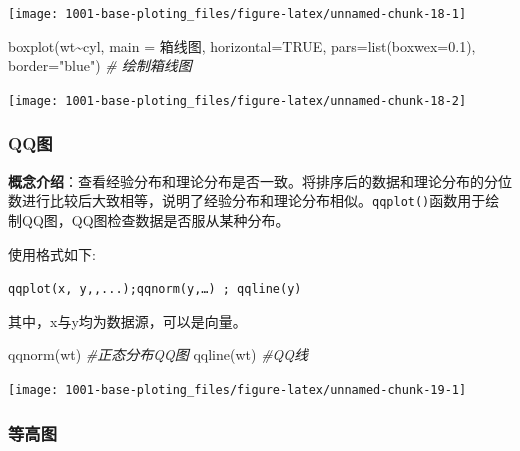 \documentclass[
]{book}
\newenvironment{Shaded}{\begin{snugshade}}{\end{snugshade}}
\newcommand{\AttributeTok}[1]{\textcolor[rgb]{0.77,0.63,0.00}{#1}}
\newcommand{\CommentTok}[1]{\textcolor[rgb]{0.56,0.35,0.01}{\textit{#1}}}
\newcommand{\ConstantTok}[1]{\textcolor[rgb]{0.00,0.00,0.00}{#1}}
\newcommand{\FloatTok}[1]{\textcolor[rgb]{0.00,0.00,0.81}{#1}}
\newcommand{\FunctionTok}[1]{\textcolor[rgb]{0.00,0.00,0.00}{#1}}
\newcommand{\NormalTok}[1]{#1}
\newcommand{\SpecialCharTok}[1]{\textcolor[rgb]{0.00,0.00,0.00}{#1}}
\newcommand{\StringTok}[1]{\textcolor[rgb]{0.31,0.60,0.02}{#1}}
\begin{document}
\begin{center}\texttt{[image: 1001-base-ploting\_files/figure-latex/unnamed-chunk-18-1]} \end{center}

\begin{Shaded}
\begin{Highlighting}[]
\FunctionTok{boxplot}\NormalTok{(wt}\SpecialCharTok{\textasciitilde{}}\NormalTok{cyl, }\AttributeTok{main =} \StringTok{\textquotesingle{}箱线图\textquotesingle{}}\NormalTok{, }\AttributeTok{horizontal=}\ConstantTok{TRUE}\NormalTok{,}
        \AttributeTok{pars=}\FunctionTok{list}\NormalTok{(}\AttributeTok{boxwex=}\FloatTok{0.1}\NormalTok{), }\AttributeTok{border=}\StringTok{"blue"}\NormalTok{)  }\CommentTok{\# 绘制箱线图}
\end{Highlighting}
\end{Shaded}

\begin{center}\texttt{[image: 1001-base-ploting\_files/figure-latex/unnamed-chunk-18-2]} \end{center}

\hypertarget{qqux56fe}{%
\subsubsection{QQ图}\label{qqux56fe}}

\textbf{概念介绍}：查看经验分布和理论分布是否一致。将排序后的数据和理论分布的分位数进行比较后大致相等，说明了经验分布和理论分布相似。\texttt{qqplot()}函数用于绘制QQ图，QQ图检查数据是否服从某种分布。

使用格式如下:

\texttt{qqplot(x,\ y,,...);qqnorm(y,…)\ ;\ qqline(y)}

其中，x与y均为数据源，可以是向量。

\begin{Shaded}
\begin{Highlighting}[]
\FunctionTok{qqnorm}\NormalTok{(wt)     }\CommentTok{\#正态分布QQ图}
\FunctionTok{qqline}\NormalTok{(wt)      }\CommentTok{\#QQ线}
\end{Highlighting}
\end{Shaded}

\begin{center}\texttt{[image: 1001-base-ploting\_files/figure-latex/unnamed-chunk-19-1]} \end{center}

\hypertarget{ux7b49ux9ad8ux56fe}{%
\subsubsection{等高图}\label{ux7b49ux9ad8ux56fe}}
\end{document}
